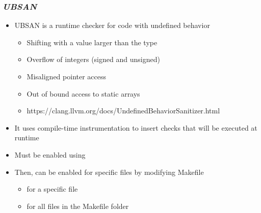 \begin{frame}
  \frametitle{{\em UBSAN}}
  \begin{itemize}
    \item UBSAN is a runtime checker for code with undefined behavior
    \begin{itemize}
      \item Shifting with a value larger than the type
      \item Overflow of integers (signed and unsigned)
      \item Misaligned pointer access
      \item Out of bound access to static arrays
      \item https://clang.llvm.org/docs/UndefinedBehaviorSanitizer.html
    \end{itemize}
    \item It uses compile-time instrumentation to insert checks that will be
          executed at runtime
    \item Must be enabled using 
    \item Then, can be enabled for specific files by modifying Makefile
    \begin{itemize}
      \item {} for a specific file
      \item {} for all files in the Makefile folder
    \end{itemize}
  \end{itemize}
\end{frame}

